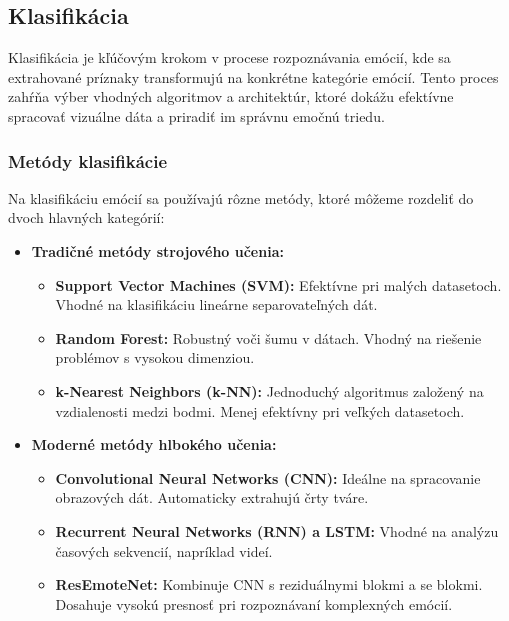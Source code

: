 \subsection{Klasifikácia}

Klasifikácia je kľúčovým krokom v procese rozpoznávania emócií, kde sa extrahované príznaky transformujú na konkrétne kategórie emócií. Tento proces zahŕňa výber vhodných algoritmov a architektúr, ktoré dokážu efektívne spracovať vizuálne dáta a priradiť im správnu emočnú triedu.

\subsubsection{Metódy klasifikácie}
Na klasifikáciu emócií sa používajú rôzne metódy, ktoré môžeme rozdeliť do dvoch hlavných kategórií:

\begin{itemize}
    \item \textbf{Tradičné metódy strojového učenia:}
    \begin{itemize}
        \item \textbf{Support Vector Machines (SVM):} 
        Efektívne pri malých datasetoch. Vhodné na klasifikáciu lineárne separovateľných dát.
        \item \textbf{Random Forest:} 
        Robustný voči šumu v dátach. Vhodný na riešenie problémov s vysokou dimenziou.
        \item \textbf{k-Nearest Neighbors (k-NN):} 
        Jednoduchý algoritmus založený na vzdialenosti medzi bodmi. Menej efektívny pri veľkých datasetoch.
    \end{itemize}
    
    \item \textbf{Moderné metódy hlbokého učenia:}
    \begin{itemize}
        \item \textbf{Convolutional Neural Networks (CNN):} 
        Ideálne na spracovanie obrazových dát. Automaticky extrahujú črty tváre.
        \item \textbf{Recurrent Neural Networks (RNN) a LSTM:} 
        Vhodné na analýzu časových sekvencií, napríklad videí.
        \item \textbf{ResEmoteNet:} 
        Kombinuje CNN s reziduálnymi blokmi a \gls{se} blokmi. Dosahuje vysokú presnosť pri rozpoznávaní komplexných emócií.
    \end{itemize}
\end{itemize}

